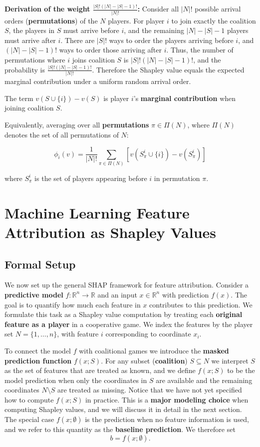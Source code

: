 \documentclass{article}
\begin{document}
\textbf{Derivation of the weight $\frac{|S|! (|N| - |S| - 1)!}{|N|!}$:}
Consider all $|N|!$ possible arrival orders (\textbf{permutations}) of the $N$ players.
For player $i$ to join exactly the coalition $S$, the players in $S$ must arrive before $i$, and the remaining $|N| - |S| - 1$ players must arrive after $i$.
There are $|S|!$ ways to order the players arriving before $i$, and $(|N| - |S| - 1)!$ ways to order those arriving after $i$.
Thus, the number of permutations where $i$ joins coalition $S$ is $|S|! (|N| - |S| - 1)!$, and the probability is $\frac{|S|! (|N| - |S| - 1)!}{|N|!}$.
Therefore the Shapley value equals the expected marginal contribution under a uniform random arrival order.

The term $v(S \cup \{i\}) - v(S)$ is player $i$'s \textbf{marginal contribution} when joining coalition $S$.

Equivalently, averaging over all \textbf{permutations} $\pi \in \Pi(N)$, where $\Pi(N)$ denotes the set of all permutations of $N$:

\begin{equation}
\phi_i(v) = \frac{1}{|N|!} \sum_{\pi \in \Pi(N)} \left[ v(S_\pi^i \cup \{i\}) - v(S_\pi^i) \right]
\end{equation}

where $S_\pi^i$ is the set of players appearing before $i$ in permutation $\pi$.

\section{Machine Learning Feature Attribution as Shapley Values}
\subsection{Formal Setup}

We now set up the general SHAP framework for feature attribution.
Consider a \textbf{predictive model} $f: \mathbb{R}^n \to \mathbb{R}$ and an input $x \in \mathbb{R}^n$ with prediction $f(x)$.
The goal is to quantify how much each feature in $x$ contributes to this prediction.
We formulate this task as a Shapley value computation by treating each \textbf{original feature as a player} in a cooperative game.
We index the features by the player set $N = \{1,\dots,n\}$, with feature $i$ corresponding to coordinate $x_i$.

To connect the model $f$ with coalitional games we introduce the \textbf{masked prediction function} $f(x; S)$.
For any subset (\textbf{coalition}) $S \subseteq N$ we interpret $S$ as the set of features that are treated as known, and we define $f(x; S)$ to be the model prediction when only the coordinates in $S$ are available and the remaining coordinates $N \setminus S$ are treated as missing.
Notice that we have not yet specified how to compute $f(x; S)$ in practice.
This is a \textbf{major modeling choice} when computing Shapley values, and we will discuss it in detail in the next section.
The special case $f(x; \emptyset)$ is the prediction when no feature information is used, and we refer to this quantity as the \textbf{baseline prediction}.
We therefore set
\[
b = f(x; \emptyset).
\]
\end{document}
